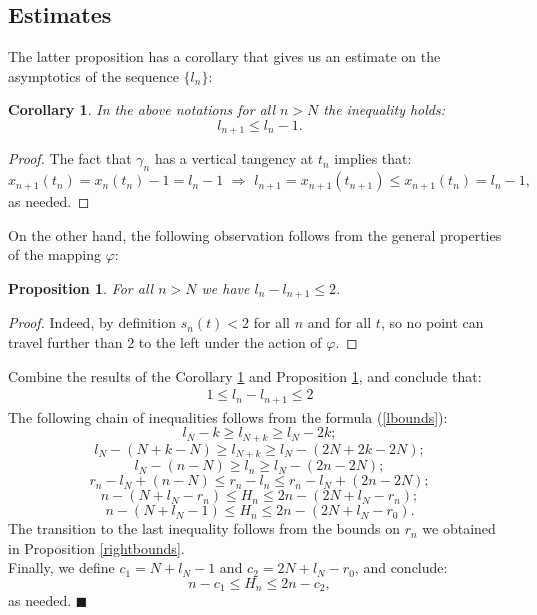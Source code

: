 \documentclass{article}
\newtheorem{corollary}[theorem]{Corollary}
\newtheorem{prop}[theorem]{Proposition}
\theoremstyle{definition}
\newcommand{\Rarr}{\Rightarrow}
\newcommand{\Le}{\leqslant}
\newcommand{\Ge}{\geqslant}
\newcommand{\vphi}{\varphi}
\begin{document}
    \subsection{Estimates}
    The latter proposition has a corollary that gives us an estimate on the asymptotics of the sequence $\{l_n\}$:
    \begin{corollary}\label{lest1}
        In the above notations for all $n > N$ the inequality holds:
        $$
        l_{n + 1} \Le l_n - 1.
        $$
    \end{corollary}
    \begin{proof}
        The fact that $\gamma_n$ has a vertical tangency at $t_n$ implies that:
        $$
        x_{n+1}(t_n) = x_n(t_n) - 1 = l_n - 1 \,\,\Rarr\,\, l_{n+1} = x_{n+1}(t_{n+1}) \Le x_{n+1}(t_n) = l_n - 1,
        $$
        as needed.
    \end{proof} 

    On the other hand, the following observation follows from the general properties of the mapping $\vphi$:
    \begin{prop}\label{lest2}
        For all $n > N$ we have $l_n - l_{n+1} \Le 2$.
    \end{prop}
    \begin{proof}
        Indeed, by definition $s_n(t) < 2$ for all $n$ and for all $t$, so no point can travel further than $2$ to the left under the action of $\vphi$.
    \end{proof}
    Combine the results of the Corollary \ref{lest1} and Proposition \ref{lest2}, and conclude that:
    \begin{align}\label{lbounds}
        1\Le l_n - l_{n+1} \Le 2
    \end{align}
    The following chain of inequalities follows from the formula (\ref{lbounds}):
    $$
    l_N - k \Ge l_{N+k} \Ge l_N - 2k;
    $$
    $$
    l_N - (N+k - N) \Ge l_{N+k} \Ge l_N - (2N + 2k - 2N);
    $$
    $$
    l_N - (n - N) \Ge l_n \Ge l_N - (2n - 2N);
    $$
    $$
    r_n - l_N + (n - N) \Le r_n - l_n \Le r_n - l_N + (2n - 2N);
    $$
    $$
    n - (N + l_N - r_n) \Le H_n \Le 2n - (2N + l_N - r_n);
    $$
    $$
    n - (N + l_N - 1) \Le H_n \Le 2n - (2N + l_N - r_0).
    $$
    The transition to the last inequality follows from the bounds on $r_n$ we obtained in Proposition \ref{rightbounds}.\\

    Finally, we define $c_1 = N + l_N - 1$ and $c_2 = 2N + l_N - r_0$, and conclude:
    $$
    n - c_1 \Le H_n \Le 2n - c_2,
    $$
    as needed. \quad $\blacksquare$
\end{document}
